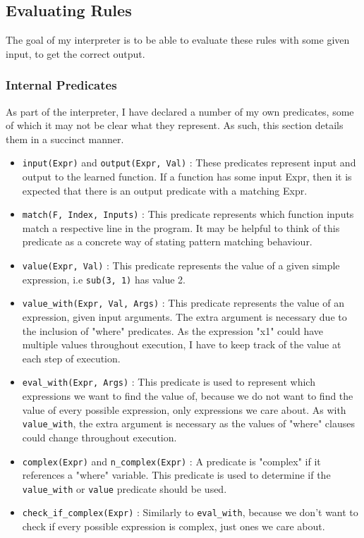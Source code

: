 \subsection{Evaluating Rules}

The goal of my interpreter is to be able to evaluate these rules with some given input, to get the correct output.

\subsubsection{Internal Predicates}
As part of the interpreter, I have declared a number of my own predicates, some of which it may not be clear what they represent. As such, this section details them in a succinct manner.
 
\begin{itemize}
\item \lstinline{input(Expr)} and \lstinline{output(Expr, Val)} : These predicates represent input and output to the learned function. If a function has some input Expr, then it is expected that there is an output predicate with a matching Expr.
\item \lstinline{match(F, Index, Inputs)} : This predicate represents which function inputs match a respective line in the program. It may be helpful to think of this predicate as a concrete way of stating pattern matching behaviour.
\item \lstinline{value(Expr, Val)} : This predicate represents the value of a given simple expression, i.e \lstinline{sub(3, 1)} has value 2.
\item \lstinline{value_with(Expr, Val, Args)} : This predicate represents the value of an expression, given input arguments. The extra argument is necessary due to the inclusion of "where" predicates. As the expression "x1" could have multiple values throughout execution, I have to keep track of the value at each step of execution.
\item \lstinline{eval_with(Expr, Args)} : This predicate is used to represent which expressions we want to find the value of, because we do not want to find the value of every possible expression, only expressions we care about. As with \lstinline{value_with}, the extra argument is necessary as the values of "where" clauses could change throughout execution. 
\item \lstinline{complex(Expr)} and \lstinline{n_complex(Expr)} : A predicate is "complex" if it references a "where" variable. This predicate is used to determine if the \lstinline{value_with} or \lstinline{value} predicate should be used.
\item \lstinline{check_if_complex(Expr)} : Similarly to \lstinline{eval_with}, because we don't want to check if every possible expression is complex, just ones we care about.
\end{itemize}

